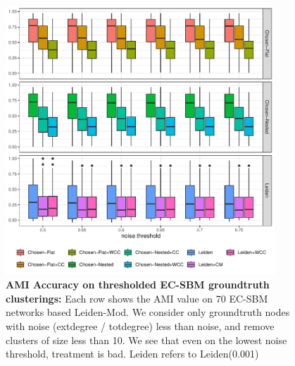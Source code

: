 \documentclass[aps,pre,superscriptaddress]{article}
\begin{document}
\begin{figure}[!htpb]
    \centering
    \includegraphics[width=0.9\textwidth]{figures/threshold_acc_leidenmod.pdf}
    \caption[]{\textbf{AMI Accuracy on thresholded EC-SBM groundtruth clusterings:} Each row shows the AMI value on 70 EC-SBM networks based Leiden-Mod. We consider only groundtruth nodes with noise (extdegree / totdegree) less than noise, and remove clusters of size less than 10. We see that even on the lowest noise threshold, treatment is bad. Leiden refers to Leiden(0.001)}
\end{figure}
\end{document}
